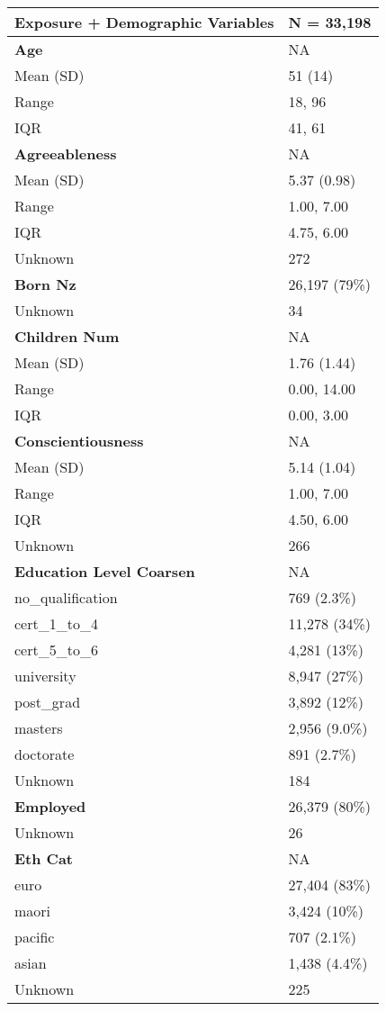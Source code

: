 \documentclass[
  single column]{article}
\begin{document}
\begin{longtable}[]{@{}ll@{}}
\toprule\noalign{}
\textbf{Exposure + Demographic Variables} & \textbf{N = 33,198} \\
\midrule\noalign{}
\endhead
\bottomrule\noalign{}
\endlastfoot
\textbf{Age} & NA \\
Mean (SD) & 51 (14) \\
Range & 18, 96 \\
IQR & 41, 61 \\
\textbf{Agreeableness} & NA \\
Mean (SD) & 5.37 (0.98) \\
Range & 1.00, 7.00 \\
IQR & 4.75, 6.00 \\
Unknown & 272 \\
\textbf{Born Nz} & 26,197 (79\%) \\
Unknown & 34 \\
\textbf{Children Num} & NA \\
Mean (SD) & 1.76 (1.44) \\
Range & 0.00, 14.00 \\
IQR & 0.00, 3.00 \\
\textbf{Conscientiousness} & NA \\
Mean (SD) & 5.14 (1.04) \\
Range & 1.00, 7.00 \\
IQR & 4.50, 6.00 \\
Unknown & 266 \\
\textbf{Education Level Coarsen} & NA \\
no\_qualification & 769 (2.3\%) \\
cert\_1\_to\_4 & 11,278 (34\%) \\
cert\_5\_to\_6 & 4,281 (13\%) \\
university & 8,947 (27\%) \\
post\_grad & 3,892 (12\%) \\
masters & 2,956 (9.0\%) \\
doctorate & 891 (2.7\%) \\
Unknown & 184 \\
\textbf{Employed} & 26,379 (80\%) \\
Unknown & 26 \\
\textbf{Eth Cat} & NA \\
euro & 27,404 (83\%) \\
maori & 3,424 (10\%) \\
pacific & 707 (2.1\%) \\
asian & 1,438 (4.4\%) \\
Unknown & 225 \\

\end{longtable}
\end{document}
